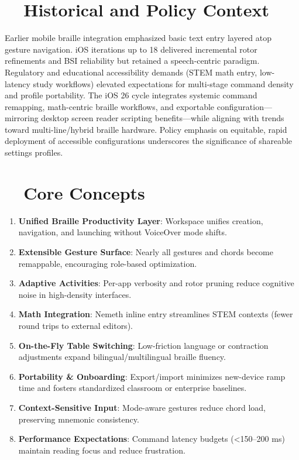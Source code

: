 \section{~~Historical and Policy Context}
\label{sec:sr30-history}
Earlier mobile braille integration emphasized basic text entry layered atop gesture navigation. iOS iterations up to 18 delivered incremental rotor refinements and BSI reliability but retained a speech-centric paradigm. Regulatory and educational accessibility demands (STEM math entry, low-latency study workflows) elevated expectations for multi-stage command density and profile portability. The iOS 26 cycle integrates systemic command remapping, math-centric braille workflows, and exportable configuration—mirroring desktop screen reader scripting benefits—while aligning with trends toward multi-line/hybrid braille hardware\supercite{nelowvision2025, myvision2025}. Policy emphasis on equitable, rapid deployment of accessible configurations underscores the significance of shareable settings profiles.

\section{~~Core Concepts}
\label{sec:sr30-core-concepts}
\begin{enumerate}
	\item \textbf{Unified Braille Productivity Layer}: Workspace unifies creation, navigation, and launching without VoiceOver mode shifts.
	\item \textbf{Extensible Gesture Surface}: Nearly all gestures and chords become remappable, encouraging role-based optimization\supercite{hks2025}.
	\item \textbf{Adaptive Activities}: Per-app verbosity and rotor pruning reduce cognitive noise in high-density interfaces\supercite{applevisVO2024}.
	\item \textbf{Math Integration}: Nemeth inline entry streamlines STEM contexts (fewer round trips to external editors)\supercite{appleSupportBSI2025}.
	\item \textbf{On-the-Fly Table Switching}: Low-friction language or contraction adjustments expand bilingual/multilingual braille fluency.
	\item \textbf{Portability \& Onboarding}: Export/import minimizes new-device ramp time and fosters standardized classroom or enterprise baselines.
	\item \textbf{Context-Sensitive Input}: Mode-aware gestures reduce chord load, preserving mnemonic consistency.
	\item \textbf{Performance Expectations}: Command latency budgets (<150–200 ms) maintain reading focus and reduce frustration.
\end{enumerate}

